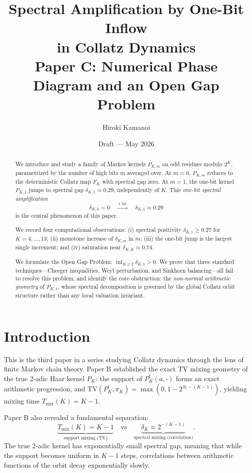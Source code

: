 \documentclass[12pt]{article}
\title{Spectral Amplification by One-Bit Inflow\\
in Collatz Dynamics\\[0.5em]
{\large Paper C: Numerical Phase Diagram and an Open Gap Problem}}
\author{Hiroki Kamanoi}
\date{Draft --- May 2026}
\theoremstyle{definition}
\newcommand{\Pkm}{P_{K,m}}
\newcommand{\PKone}{P_{K,1}}
\begin{document}
\maketitle

\begin{abstract}
We introduce and study a family of Markov kernels $\Pkm$ on odd residues modulo $2^K$, parametrized by the number of high bits $m$ averaged over. At $m=0$, $\Pkm$ reduces to the deterministic Collatz map $F_K$ with spectral gap zero. At $m=1$, the one-bit kernel $\PKone$ jumps to spectral gap $\delta_{K,1} \approx 0.29$, independently of $K$. This \emph{one-bit spectral amplification}
\[
  \delta_{K,0} = 0 \quad\xrightarrow{\;\text{1 bit}\;}\quad \delta_{K,1} \approx 0.29
\]
is the central phenomenon of this paper.

We record four computational observations: (i) spectral positivity $\delta_{K,1} \geq 0.27$ for $K = 4, \ldots, 13$; (ii) monotone increase of $\delta_{K,m}$ in $m$; (iii) the one-bit jump is the largest single increment; and (iv) saturation near $\delta_{K,K} \approx 0.74$.

We formulate the Open Gap Problem: $\inf_{K \geq 2} \delta_{K,1} > 0$. We prove that three standard techniques---Cheeger inequalities, Weyl perturbation, and Sinkhorn balancing---all fail to resolve this problem, and identify the core obstruction: the \emph{non-normal arithmetic geometry} of $\PKone$, whose spectral decomposition is governed by the global Collatz orbit structure rather than any local valuation invariant.
\end{abstract}

\tableofcontents\bigskip

\section{Introduction}

This is the third paper in a series studying Collatz dynamics through the lens of finite Markov chain theory. Paper B \cite{KamanoiB} established the exact TV mixing geometry of the true 2-adic Haar kernel $P_K$: the support of $P_K^t(a,\cdot)$ forms an exact arithmetic progression, and $\mathrm{TV}(P_K^t, \pi_K) = \max(0, 1-2^{S_t-(K-1)})$, yielding mixing time $T_{\mathrm{mix}}(K) = K-1$.

Paper B also revealed a fundamental separation:
\[
\underbrace{T_{\mathrm{mix}}(K) = K-1}_{\text{support mixing (TV)}} \quad\text{vs}\quad \underbrace{\delta_K \approx 2^{-(K-1)}}_{\text{spectral mixing (correlation)}}.
\]
The true 2-adic kernel has exponentially small spectral gap, meaning that while the support becomes uniform in $K-1$ steps, correlations between arithmetic functions of the orbit decay exponentially slowly.
\end{document}
